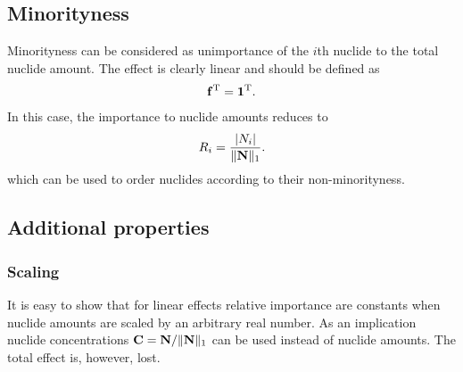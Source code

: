 





\subsection{Minorityness}

Minorityness can be considered as unimportance of the $i$th nuclide to the total nuclide amount. The effect is clearly linear and should be defined as
%
\begin{gather}
\mathbf{f}^{\mathrm{T}} = \mathbf{1}^{\mathrm{T}}.
\end{gather}
%
In this case, the importance to nuclide amounts reduces to
%
\begin{gather}
R_i = \frac{|N_i|}{\|\mathbf{N}\|_1}.
\end{gather}
%
which can be used to order nuclides according to their non-minorityness.

\subsection{Additional properties}

\subsubsection*{Scaling}

It is easy to show that for linear effects relative importance are constants when nuclide amounts are scaled by an arbitrary real number. As an implication nuclide concentrations $\mathbf{C}=\mathbf{N}/\|\mathbf{N}\|_1$ can be used instead of nuclide amounts. The total effect is, however, lost.

